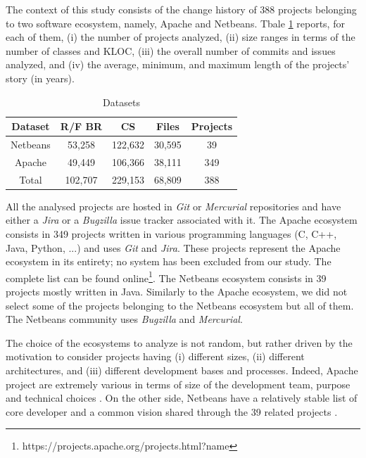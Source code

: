 The context of this study consists of the change history of 388 projects belonging to two software ecosystem, namely, Apache and Netbeans.
Tbale \ref{table:datasets} reports, for each of them, (i) the number of projects analyzed, (ii) size ranges in terms of the number of classes and KLOC, (iii) the overall number of commits and issues analyzed, and (iv) the average, minimum, and maximum length of the projects' story (in years).

\begin{table}[h]
\begin{center}
\begin{tabular}{@{}c|c|c|c|c@{}}
\textbf{Dataset} & \textbf{R/F BR} & \textbf{CS} & \textbf{Files} & \textbf{Projects} \\ \hline \hline
Netbeans         & 53,258          & 122,632     & 30,595         & 39                \\
Apache           & 49,449          & 106,366     & 38,111         & 349               \\
Total            & 102,707         & 229,153     & 68,809         & 388               \\ \hline \hline

\end{tabular}
\end{center}

\caption{Datasets\label{table:datasets}}
\end{table}



All the analysed projects are hosted in {\it Git} or {\it Mercurial} repositories and have either a {\it Jira} or a {\it Bugzilla} issue tracker associated with it.
The Apache ecosystem consists in 349 projects written in various programming languages (C, C++, Java, Python, ...) and uses {\it Git} and {\it Jira}.
These projects represent the Apache ecosystem in its entirety; no system has been excluded from our study.
The complete list can be found online\footnote{https://projects.apache.org/projects.html?name}.
The Netbeans ecosystem consists in 39 projects mostly written in Java.
Similarly to the Apache ecosystem, we did not select some of the projects belonging to the Netbeans ecosystem but all of them.
The Netbeans community uses {\it Bugzilla} and {\it Mercurial}.

The choice of the ecosystems to analyze is not random, but rather driven by the motivation to consider projects having (i) different sizes, (ii) different architectures, and (iii) different development bases and processes.
Indeed, Apache project are extremely various in terms of size of the development team, purpose and technical choices \cite{Bavota2013}.
On the other side, Netbeans have a relatively stable list of core developer and a common vision shared through the 39 related projects \cite{Wang2011}.

